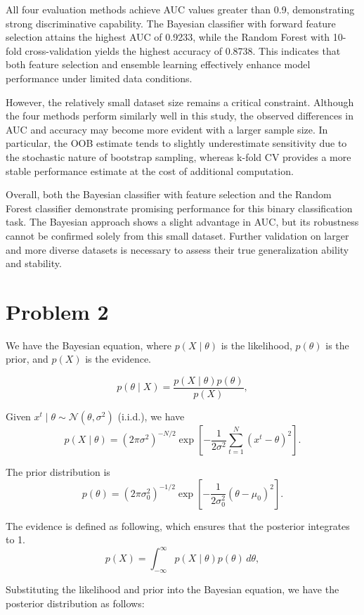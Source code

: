 \documentclass[12pt,a4paper]{article}
\begin{document}
All four evaluation methods achieve AUC values greater than 0.9, demonstrating strong discriminative capability. The Bayesian classifier with forward feature selection attains the highest AUC of 0.9233, while the Random Forest with 10-fold cross-validation yields the highest accuracy of 0.8738. This indicates that both feature selection and ensemble learning effectively enhance model performance under limited data conditions.

However, the relatively small dataset size remains a critical constraint. Although the four methods perform similarly well in this study, the observed differences in AUC and accuracy may become more evident with a larger sample size. In particular, the OOB estimate tends to slightly underestimate sensitivity due to the stochastic nature of bootstrap sampling, whereas k-fold CV provides a more stable performance estimate at the cost of additional computation.

Overall, both the Bayesian classifier with feature selection and the Random Forest classifier demonstrate promising performance for this binary classification task. The Bayesian approach shows a slight advantage in AUC, but its robustness cannot be confirmed solely from this small dataset. Further validation on larger and more diverse datasets is necessary to assess their true generalization ability and stability.

\newpage
\section{Problem 2}

We have the Bayesian equation, where $p(X \mid \theta)$ is the likelihood, $p(\theta)$ is the prior, and $p(X)$ is the evidence.

$$
p(\theta \mid X) = \frac{p(X \mid \theta)p(\theta)}{p(X)},
$$


Given \( x^t \mid \theta \sim \mathcal{N}(\theta, \sigma^2) \) (i.i.d.), we have
\[
p(X \mid \theta)
= (2\pi\sigma^2)^{-N/2}
\exp\!\left[-\frac{1}{2\sigma^2}\sum_{t=1}^{N}(x^t - \theta)^2\right].
\]

The prior distribution is
\[
p(\theta)
= (2\pi\sigma_0^2)^{-1/2}
\exp\!\left[-\frac{1}{2\sigma_0^2}(\theta - \mu_0)^2\right].
\]

The evidence is defined as following, which ensures that the posterior integrates to 1.
\[
p(X) = \int_{-\infty}^{\infty} p(X \mid \theta)p(\theta)\,d\theta,
\]

Substituting the likelihood and prior into the Bayesian equation, we have the posterior distribution as follows:
\end{document}
